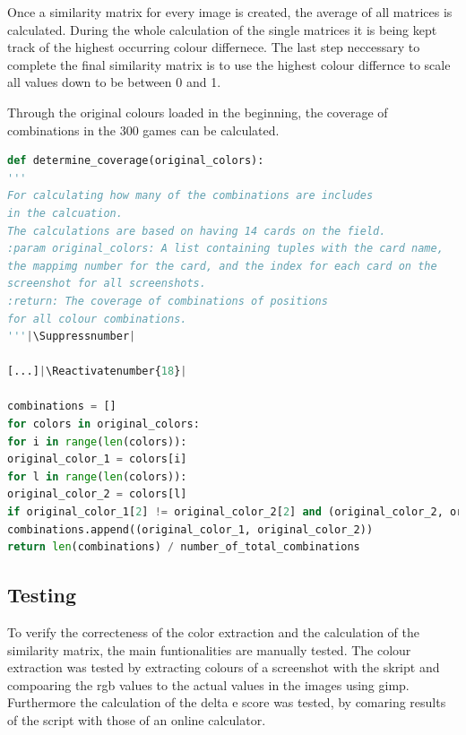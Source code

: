 %	
Once a similarity matrix for every image is created, the average of all matrices is calculated. During the whole calculation of the single matrices it is being kept track of the highest occurring colour differnece. The last step neccessary to complete the final similarity matrix is to use the highest colour differnce to scale all values down to be between 0 and 1. 

Through the original colours loaded in the beginning, the coverage of combinations in the 300 games can be calculated. 
\begin{lstlisting}[language=python, caption=Add caption]
def determine_coverage(original_colors):
'''
For calculating how many of the combinations are includes 
in the calcuation. 
The calculations are based on having 14 cards on the field.
:param original_colors: A list containing tuples with the card name, 
the mappimg number for the card, and the index for each card on the 
screenshot for all screenshots.
:return: The coverage of combinations of positions 
for all colour combinations. 
'''|\Suppressnumber|

[...]|\Reactivatenumber{18}|

combinations = []
for colors in original_colors:
for i in range(len(colors)):
original_color_1 = colors[i]
for l in range(len(colors)):
original_color_2 = colors[l]
if original_color_1[2] != original_color_2[2] and (original_color_2, original_color_1) not in combinations and (original_color_1, original_color_2) not in combinations:
combinations.append((original_color_1, original_color_2))    
return len(combinations) / number_of_total_combinations
\end{lstlisting}

\subsection{Testing}
To verify the correcteness of the color extraction and the calculation of the similarity matrix, the main funtionalities are manually tested. The colour extraction was tested by extracting colours of a screenshot with the skript and compoaring the rgb values to the actual values in the images using gimp. Furthermore the calculation of the delta e score was tested, by comaring results of the script with those of an online calculator. \\

